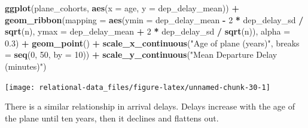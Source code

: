 \documentclass[]{book}
\newenvironment{Shaded}{\begin{snugshade}}{\end{snugshade}}
\newcommand{\DataTypeTok}[1]{\textcolor[rgb]{0.13,0.29,0.53}{#1}}
\newcommand{\DecValTok}[1]{\textcolor[rgb]{0.00,0.00,0.81}{#1}}
\newcommand{\FloatTok}[1]{\textcolor[rgb]{0.00,0.00,0.81}{#1}}
\newcommand{\KeywordTok}[1]{\textcolor[rgb]{0.13,0.29,0.53}{\textbf{#1}}}
\newcommand{\NormalTok}[1]{#1}
\newcommand{\OperatorTok}[1]{\textcolor[rgb]{0.81,0.36,0.00}{\textbf{#1}}}
\newcommand{\StringTok}[1]{\textcolor[rgb]{0.31,0.60,0.02}{#1}}
\theoremstyle{plain}
\theoremstyle{remark}
\begin{document}
\begin{Shaded}
\begin{Highlighting}[]
\KeywordTok{ggplot}\NormalTok{(plane_cohorts, }\KeywordTok{aes}\NormalTok{(}\DataTypeTok{x =}\NormalTok{ age, }\DataTypeTok{y =}\NormalTok{ dep_delay_mean)) }\OperatorTok{+}
\StringTok{  }\KeywordTok{geom_ribbon}\NormalTok{(}\DataTypeTok{mapping =} \KeywordTok{aes}\NormalTok{(}\DataTypeTok{ymin =}\NormalTok{ dep_delay_mean }\OperatorTok{-}\StringTok{ }
\StringTok{                              }\DecValTok{2} \OperatorTok{*}\StringTok{ }\NormalTok{dep_delay_sd }\OperatorTok{/}\StringTok{ }\KeywordTok{sqrt}\NormalTok{(n), }
                            \DataTypeTok{ymax =}\NormalTok{ dep_delay_mean }\OperatorTok{+}\StringTok{ }
\StringTok{                              }\DecValTok{2} \OperatorTok{*}\StringTok{ }\NormalTok{dep_delay_sd }\OperatorTok{/}\StringTok{ }\KeywordTok{sqrt}\NormalTok{(n)),}
              \DataTypeTok{alpha =} \FloatTok{0.3}\NormalTok{) }\OperatorTok{+}
\StringTok{  }\KeywordTok{geom_point}\NormalTok{() }\OperatorTok{+}
\StringTok{  }\KeywordTok{scale_x_continuous}\NormalTok{(}\StringTok{"Age of plane (years)"}\NormalTok{, }\DataTypeTok{breaks =} \KeywordTok{seq}\NormalTok{(}\DecValTok{0}\NormalTok{, }\DecValTok{50}\NormalTok{, }\DataTypeTok{by =} \DecValTok{10}\NormalTok{)) }\OperatorTok{+}
\StringTok{  }\KeywordTok{scale_y_continuous}\NormalTok{(}\StringTok{"Mean Departure Delay (minutes)"}\NormalTok{)}
\end{Highlighting}
\end{Shaded}

\begin{center}\texttt{[image: relational-data\_files/figure-latex/unnamed-chunk-30-1]} \end{center}

There is a similar relationship in arrival delays. Delays increase with the age
of the plane until ten years, then it declines and flattens out.
\end{document}
